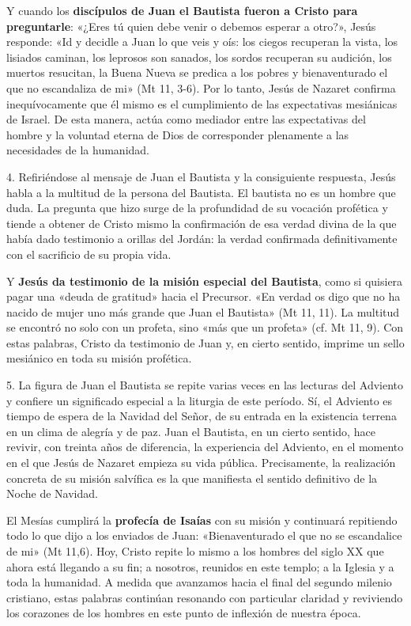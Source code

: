 \documentclass[]{article}
\begin{document}
Y cuando los \textbf{discípulos de Juan el Bautista fueron a Cristo para
preguntarle}: «¿Eres tú quien debe venir o debemos esperar a otro?»,
Jesús responde: «Id y decidle a Juan lo que veis y oís: los ciegos
recuperan la vista, los lisiados caminan, los leprosos son sanados, los
sordos recuperan su audición, los muertos resucitan, la Buena Nueva se
predica a los pobres y bienaventurado el que no escandaliza de mi» (Mt
11, 3-6). Por lo tanto, Jesús de Nazaret confirma inequívocamente que él
mismo es el cumplimiento de las expectativas mesiánicas de Israel. De
esta manera, actúa como mediador entre las expectativas del hombre y la
voluntad eterna de Dios de corresponder plenamente a las necesidades de
la humanidad.

4. Refiriéndose al mensaje de Juan el Bautista y la consiguiente
respuesta, Jesús habla a la multitud de la persona del Bautista. El
bautista no es un hombre que duda. La pregunta que hizo surge de la
profundidad de su vocación profética y tiende a obtener de Cristo mismo
la confirmación de esa verdad divina de la que había dado testimonio a
orillas del Jordán: la verdad confirmada definitivamente con el
sacrificio de su propia vida.

Y \textbf{Jesús da testimonio de la misión especial del Bautista}, como
si quisiera pagar una «deuda de gratitud» hacia el Precursor. «En verdad
os digo que no ha nacido de mujer uno más grande que Juan el Bautista»
(Mt 11, 11). La multitud se encontró no solo con un profeta, sino «más
que un profeta» (cf. Mt 11, 9). Con estas palabras, Cristo da testimonio
de Juan y, en cierto sentido, imprime un sello mesiánico en toda su
misión profética.

5. La figura de Juan el Bautista se repite varias veces en las lecturas
del Adviento y confiere un significado especial a la liturgia de este
período. Sí, el Adviento es tiempo de espera de la Navidad del Señor, de
su entrada en la existencia terrena en un clima de alegría y de paz.
Juan el Bautista, en un cierto sentido, hace revivir, con treinta años
de diferencia, la experiencia del Adviento, en el momento en el que
Jesús de Nazaret empieza su vida pública. Precisamente, la realización
concreta de su misión salvífica es la que manifiesta el sentido
definitivo de la Noche de Navidad.

El Mesías cumplirá la \textbf{profecía de Isaías} con su misión y
continuará repitiendo todo lo que dijo a los enviados de Juan:
«Bienaventurado el que no se escandalice de mi» (Mt 11,6). Hoy, Cristo
repite lo mismo a los hombres del siglo XX que ahora está llegando a su
fin; a nosotros, reunidos en este templo; a la Iglesia y a toda la
humanidad. A medida que avanzamos hacia el final del segundo milenio
cristiano, estas palabras continúan resonando con particular claridad y
reviviendo los corazones de los hombres en este punto de inflexión de
nuestra época.
\end{document}
